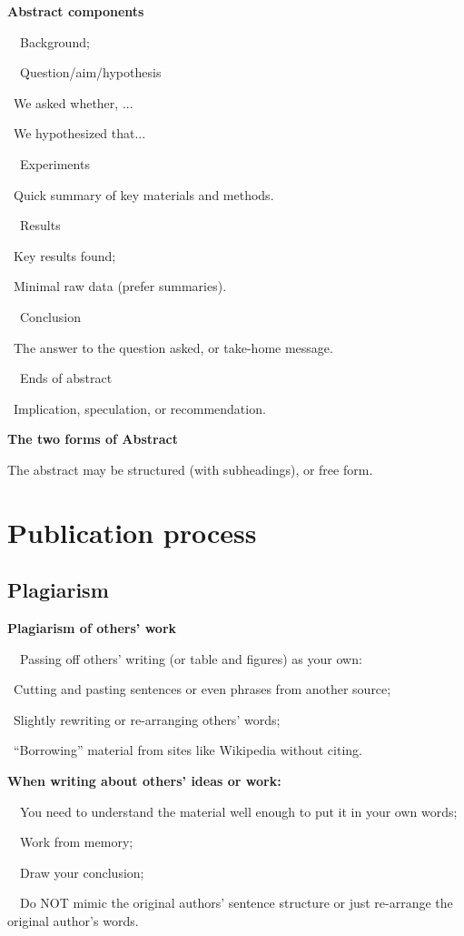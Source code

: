 \documentclass[a4paper, 12pt]{article}
\begin{document}
\textbf{Abstract components}
\par\ \textbullet\ Background;
\par\ \textbullet\ Question/aim/hypothesis
\par\quad\textopenbullet\ We asked whether, ...
\par\quad\textopenbullet\ We hypothesized that...
\par\ \textbullet\ Experiments
\par\quad\textopenbullet\ Quick summary of key materials and methods.
\par\ \textbullet\ Results
\par\quad\textopenbullet\ Key results found;
\par\quad\textopenbullet\ Minimal raw data (prefer summaries).
\par\ \textbullet\ Conclusion
\par\quad\textopenbullet\ The answer to the question asked, or take-home message.
\par\ \textbullet\ Ends of abstract
\par\quad\textopenbullet\ Implication, speculation, or recommendation.

\textbf{The two forms of Abstract}
\par The abstract may be structured (with subheadings), or free form.

\newpage\quad

\newpage\section{Publication process}

\subsection{Plagiarism}

\textbf{Plagiarism of others' work}
\par\ \textbullet\ Passing off others' writing (or table and figures) as your own:
\par\quad\textopenbullet\ Cutting and pasting sentences or even phrases from another source;
\par\quad\textopenbullet\ Slightly rewriting or re-arranging others' words;
\par\quad\textopenbullet\ ``Borrowing'' material from sites like Wikipedia without citing.

\textbf{When writing about others' ideas or work:}
\par\ \textbullet\ You need to understand the material well enough to put it in your own words;
\par\ \textbullet\ Work from memory;
\par\ \textbullet\ Draw your conclusion;
\par\ \textbullet\ Do NOT mimic the original authors' sentence structure or just re-arrange the original author's words.
\end{document}
